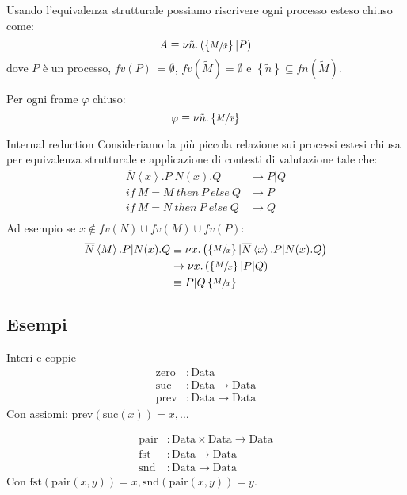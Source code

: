 \documentclass{beamer}
\theoremstyle{plain}
\theoremstyle{definition}
\theoremstyle{remark}
\newcommand{\obar}[1]{\overline{#1}}
\newcommand{\set}[1]{\left\{#1\right\}}
\newcommand{\pa}[1]{\left(#1\right)}
\newcommand{\ang}[1]{\left<#1\right>}
\begin{document}
\begin{frame}
  Usando l'equivalenza strutturale possiamo riscrivere ogni processo
  esteso chiuso come:
  \[ A \equiv \nu \tilde n. \pa{ \set{\sfrac{\tilde M}{\tilde x}} | P
    } \]
  dove $P$ \`e un processo, $fv(P)\ = \emptyset$, $fv(\tilde M) =
  \emptyset$ e $\set{\tilde n} \subseteq fn(\tilde M)$.
  \vfill

  Per ogni frame $\varphi$ chiuso:
  \[ \varphi \equiv \nu \tilde n. \set{\sfrac{\tilde M}{\tilde x}} \]
\end{frame}

\begin{frame}{Internal reduction}
  Consideriamo la pi\`u piccola relazione sui processi estesi chiusa
  per equivalenza strutturale e applicazione di contesti di
  valutazione tale che:
  \begin{align*}
    \obar{N}\ang{x}.P|N(x).Q & \rightarrow P|Q \\
    if\ M=M\ then\ P\ else\ Q & \rightarrow P \\
    if\ M=N\ then\ P\ else\ Q & \rightarrow Q \\
  \end{align*}
  \vfill
  \pause 
  Ad esempio se $x \not\in fv(N)\cup fv(M)\cup fv(P)$:
  \begin{align*}
    \obar{N}\ang{M}.P | N(x).Q & \equiv \nu x.\pa{ \set{\sfrac{M}{x}}
                                 | \obar{N} \ang{x}.P | N(x).Q } \\
    & \rightarrow \nu x.\pa{\set{\sfrac{M}{x}}|P|Q} \\
    & \equiv P|Q\set{\sfrac{M}{x}}
  \end{align*}
\end{frame}

\subsection{Esempi}

\begin{frame}{Interi e coppie}
  \begin{align*}
    \mathrm{zero} &: \mathrm{Data} \\
    \mathrm{suc} &: \mathrm{Data} \rightarrow \mathrm{Data} \\
    \mathrm{prev} &: \mathrm{Data} \rightarrow \mathrm{Data}
  \end{align*}
  Con assiomi: \( \mathrm{prev} \pa{ \mathrm{suc} (x) } = x, \dots \)
  \vfill
  
  \begin{align*}
    \mathrm{pair} &: \mathrm{Data} \times \mathrm{Data} \rightarrow
                    \mathrm{Data} \\
    \mathrm{fst} &: \mathrm{Data} \rightarrow \mathrm{Data} \\
    \mathrm{snd} &: \mathrm{Data} \rightarrow \mathrm{Data}
  \end{align*}
  Con $\mathrm{fst}\pa{\mathrm{pair}(x,y)} = x, \mathrm{snd}\pa{\mathrm{pair}(x,y)} = y$.
\end{frame}
\end{document}
